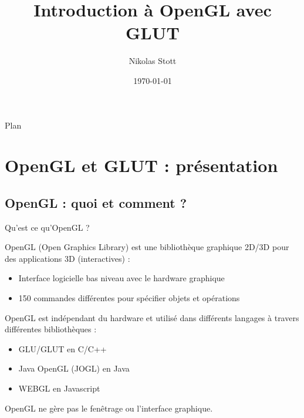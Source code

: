 \documentclass{beamer}
\title{Introduction à OpenGL avec GLUT}
\author[Nikolas Stott]{Nikolas Stott}
\institute[INRIA - CMAP]{INRIA Saclay - CMAP, \'Ecole Polytechnique, Universit\'e Paris-Saclay}
\date{\today}
\begin{document}
\begin{frame}
\titlepage
\end{frame}

\begin{frame}{Plan}
\tableofcontents
\end{frame}


\section{OpenGL et GLUT : présentation}

\subsection{OpenGL : quoi et comment ?}
\begin{frame}{Qu'est ce qu'OpenGL ?}
	\begin{block}{}
		OpenGL (Open Graphics Library) est une bibliothèque graphique 2D/3D pour des applications 3D (interactives) :
		\begin{itemize}
			\item Interface logicielle bas niveau avec le hardware graphique
			\item 150 commandes différentes pour spécifier objets et opérations
		\end{itemize}
	\end{block}
	\pause
	\begin{block}{}
		OpenGL est indépendant du hardware et utilisé dans différents langages à travers différentes bibliothèques :
		\begin{itemize}
			\item GLU/GLUT en C/C++
			\item Java OpenGL (JOGL) en Java
			\item WEBGL en Javascript
		\end{itemize}
	\end{block}
	\pause
	\begin{block}{}
		OpenGL ne gère pas le fenêtrage ou l'interface graphique.
	\end{block}
\end{frame}
\end{document}
